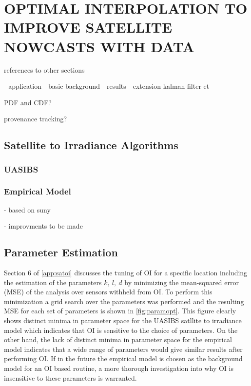 \chapter{OPTIMAL INTERPOLATION TO IMPROVE SATELLITE NOWCASTS WITH DATA}
\label{chap:satoi}

references to other sections

- application
- basic background
- results
- extension kalman filter et

PDF and CDF?

provenance tracking?

\section{Satellite to Irradiance Algorithms}
\subsection{UASIBS}

\subsection{Empirical Model}
- based on suny

- improvments to be made

\section{Parameter Estimation}
\label{sec:paramopt}
Section 6 of \cref{app:satoi} discusses the tuning of OI for a
specific location including the estimation of the parameters
$k,\: l,\: d$ by minimizing the mean-squared error (MSE) of the
analysis over sensors withheld from OI.
To perform this minimization a grid search over the parameters was
performed and the resulting MSE for each set of parameters is shown in
\cref{fig:paramopt}.
This figure clearly shows distinct minima in parameter space for the
UASIBS satllite to irradiance model which indicates that  OI is
sensitive to the choice of parameters.
On the other hand, the lack of distinct minima in parameter space for
the empirical model indicates that a wide range of parameters would
give similar results after performing OI.
If in the future the empirical model is chosen as the background model
for an OI based routine, a more thorough investigation into why OI is
insensitive to these parameters is warranted.

